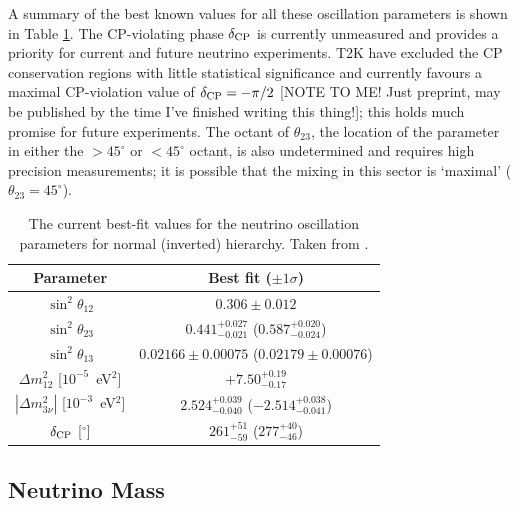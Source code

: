 A summary of the best known values for all these oscillation parameters is shown in Table \ref{tab:OscillationParameters}.  The CP-violating phase $\delta_{\textnormal{CP}}$ is currently unmeasured and provides a priority for current and future neutrino experiments.  T2K have excluded the CP conservation regions with little statistical significance and currently favours a maximal CP-violation value of $\delta_{\textnormal{CP}} = -\pi/2$ \cite{T2K2017} [{\color{red}NOTE TO ME! Just preprint, may be published by the time I've finished writing this thing!}]; this holds much promise for future experiments.  The octant of $\theta_{23}$, the location of the parameter in either the $> 45^{\circ}$ or $< 45^{\circ}$ octant, is also undetermined and requires high precision measurements; it is possible that the mixing in this sector is `maximal' ($\theta_{23} = 45^{\circ}$).

\begin{table}
  \caption{The current best-fit values for the neutrino oscillation parameters for normal (inverted) hierarchy.  Taken from \cite{NuFit2017}.}
  \label{tab:OscillationParameters}
  \centering
    \begin{tabular}{c c}
      \toprule
      Parameter & Best fit ($\pm 1\sigma$) \\
      \midrule
      $\sin^2{\theta_{12}}$ & $0.306\pm0.012$ \\
      $\sin^2{\theta_{23}}$ & $0.441^{+0.027}_{-0.021}$ ($0.587^{+0.020}_{-0.024}$) \\
      $\sin^2{\theta_{13}}$ & $0.02166\pm0.00075$ ($0.02179\pm0.00076$) \\
      \midrule
      $\Delta m_{12}^2$ [$10^{-5}$~eV$^2$]     & $+7.50^{+0.19}_{-0.17}$ \\
      $|\Delta m_{3\nu}^2|$ [$10^{-3}$~eV$^2$] & $2.524^{+0.039}_{-0.040}$ ($-2.514^{+0.038}_{-0.041}$) \\
      \midrule
      $\delta_{\textnormal{CP}}$ [$^{\circ}$] & $261^{+51}_{-59}$ ($277^{+40}_{-46}$) \\
      \bottomrule
    \end{tabular}
\end{table}

\subsection{Neutrino Mass}\label{sec:NeutrinoMass}

